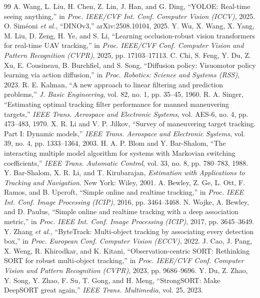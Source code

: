 \documentclass[12pt,a4paper]{article}
\begin{document}
\begin{thebibliography}{99}
 A. Wang, L. Liu, H. Chen, Z. Lin, J. Han, and G. Ding, ``YOLOE: Real-time seeing anything,'' in \emph{Proc. IEEE/CVF Int. Conf. Computer Vision (ICCV)}, 2025.
 O. Siméoni \emph{et al.}, ``DINOv3,'' arXiv:2508.10104, 2025.
 Y. Wu, X. Wang, X. Yang, M. Liu, D. Zeng, H. Ye, and S. Li, ``Learning occlusion-robust vision transformers for real-time UAV tracking,'' in \emph{Proc. IEEE/CVF Conf. Computer Vision and Pattern Recognition (CVPR)}, 2025, pp. 17103–17113.
 C. Chi, S. Feng, Y. Du, Z. Xu, E. Cousineau, B. Burchfiel, and S. Song, ``Diffusion policy: Visuomotor policy learning via action diffusion,'' in \emph{Proc. Robotics: Science and Systems (RSS)}, 2023.
 R. E. Kalman, ``A new approach to linear filtering and prediction problems,'' \emph{J. Basic Engineering}, vol. 82, no. 1, pp. 35–45, 1960.
 R. A. Singer, ``Estimating optimal tracking filter performance for manned maneuvering targets,'' \emph{IEEE Trans. Aerospace and Electronic Systems}, vol. AES-6, no. 4, pp. 473–483, 1970.
 X. R. Li and V. P. Jilkov, ``Survey of maneuvering target tracking. Part I: Dynamic models,'' \emph{IEEE Trans. Aerospace and Electronic Systems}, vol. 39, no. 4, pp. 1333–1364, 2003.
 H. A. P. Blom and Y. Bar-Shalom, ``The interacting multiple model algorithm for systems with Markovian switching coefficients,'' \emph{IEEE Trans. Automatic Control}, vol. 33, no. 8, pp. 780–783, 1988.
 Y. Bar-Shalom, X. R. Li, and T. Kirubarajan, \emph{Estimation with Applications to Tracking and Navigation}. New York: Wiley, 2001.
 A. Bewley, Z. Ge, L. Ott, F. Ramos, and B. Upcroft, ``Simple online and realtime tracking,'' in \emph{Proc. IEEE Int. Conf. Image Processing (ICIP)}, 2016, pp. 3464–3468.
 N. Wojke, A. Bewley, and D. Paulus, ``Simple online and realtime tracking with a deep association metric,'' in \emph{Proc. IEEE Int. Conf. Image Processing (ICIP)}, 2017, pp. 3645–3649.
 Y. Zhang \emph{et al.}, ``ByteTrack: Multi-object tracking by associating every detection box,'' in \emph{Proc. European Conf. Computer Vision (ECCV)}, 2022.
 J. Cao, J. Pang, X. Weng, R. Khirodkar, and K. Kitani, ``Observation-centric SORT: Rethinking SORT for robust multi-object tracking,'' in \emph{Proc. IEEE/CVF Conf. Computer Vision and Pattern Recognition (CVPR)}, 2023, pp. 9686–9696.
 Y. Du, Z. Zhao, Y. Song, Y. Zhao, F. Su, T. Gong, and H. Meng, ``StrongSORT: Make DeepSORT great again,'' \emph{IEEE Trans. Multimedia}, vol. 25, 2023.

\end{thebibliography}
\end{document}
